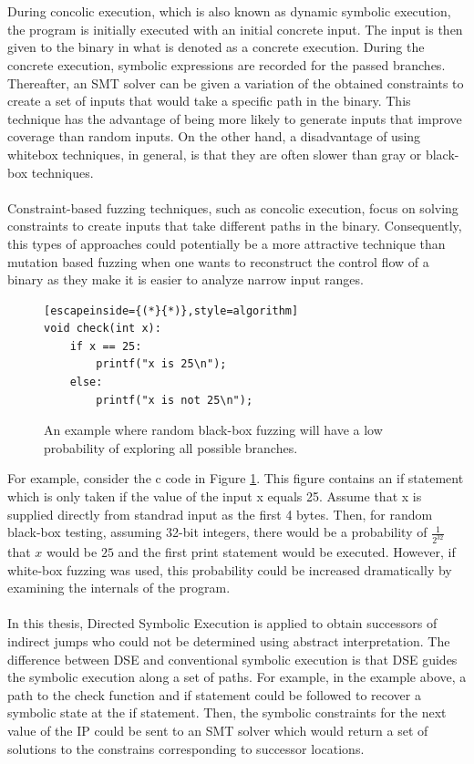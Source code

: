 \documentclass{kththesis}
\begin{document}
\\ \\
During concolic execution, which is also known as dynamic symbolic execution, the program is initially executed with an initial concrete input. The input is then given to the binary in what is denoted as a concrete execution. During the concrete execution, symbolic expressions are recorded for the passed branches. Thereafter, an SMT solver can be given a variation of the obtained constraints to create a set of inputs that would take a specific path in the binary. This technique has the advantage of being more likely to generate inputs that improve coverage than random inputs\cite{fuzzingSurvey}. On the other hand, a disadvantage of using whitebox techniques, in general, is that they are often slower than gray or black-box techniques\cite{fuzzingSurvey}.
\\ \\
Constraint-based fuzzing techniques, such as concolic execution, focus on solving constraints to create inputs that take different paths in the binary. Consequently, this types of approaches could potentially be a more attractive technique than mutation based fuzzing when one wants to reconstruct the control flow of a binary as they make it is easier to analyze narrow input ranges.
\clearpage
\begin{figure}[!t]
    \centering
\begin{algorithmFrame}
\begin{lstlisting}[escapeinside={(*}{*)},style=algorithm]
void check(int x):
    if x == 25:
        printf("x is 25\n");
    else:
        printf("x is not 25\n");
\end{lstlisting}
\end{algorithmFrame}
\caption{An example where random black-box fuzzing will have a low probability of exploring all possible branches.}
    \label{fig:if25}
\end{figure}
\noindent
For example, consider the c code in Figure \ref{fig:if25}. This figure contains an if statement which is only taken if the value of the input x equals 25. Assume that x is supplied directly from standrad input as the first 4 bytes. Then, for random black-box testing, assuming 32-bit integers, there would be a probability of $\frac{1}{2^{32}}$ that $x$ would be $25$ and the first print statement would be executed. However, if white-box fuzzing was used, this probability could be increased dramatically by examining the internals of the program.
\\ \\
In this thesis, Directed Symbolic Execution is applied to obtain successors of indirect jumps who could not be determined using abstract interpretation. The difference between DSE and conventional symbolic execution is that DSE guides the symbolic execution along a set of paths. For example, in the example above, a path to the check function and if statement could be followed to recover a symbolic state at the if statement. Then, the symbolic constraints for the next value of the IP could be sent to an SMT solver which would return a set of solutions to the constrains corresponding to successor locations.
\end{document}
